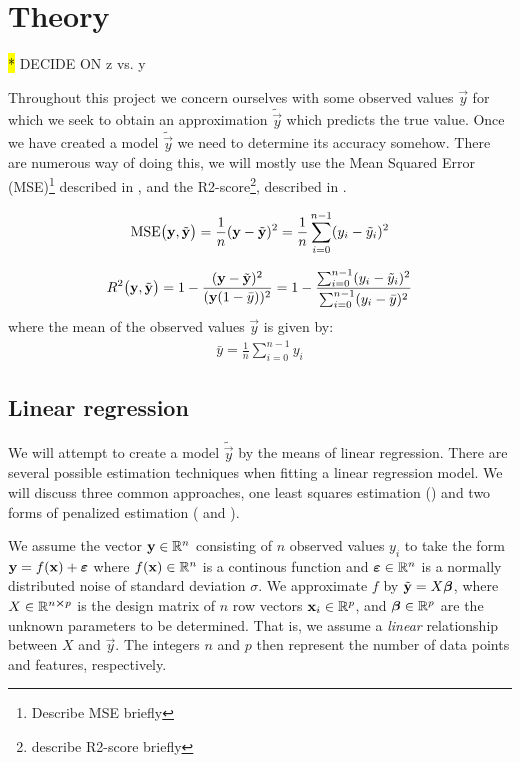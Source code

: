 \section{Theory}\label{sec:theroy}




\hl{*} DECIDE ON z vs. y

Throughout this project we concern ourselves with some observed values $\vec{y}$ for which we seek to obtain an approximation $\tilde{\vec{y}}$ which predicts the true value. Once we have created a model $\tilde{\vec{y}}$ we need to determine its accuracy somehow. There are numerous way of doing this, we will mostly use the Mean Squared Error (MSE)\footnote{Describe MSE briefly} described in , and the R2-score\footnote{describe R2-score briefly}, described in .


\begin{align}\label{eq:MSE}
    \MSE{\vec{y}, \tilde{\vec{y}}}= \frac{1}{n}(\vec{y}-\tilde{\vec{y}})^2= \frac{1}{n}\sum_{i=0}^{n-1} (y_i - \tilde{y}_i)^2
\end{align}

\begin{align}\label{eq:R2}
    \Rtwo {\vec{y}, \tilde{\vec{y}}} =1 - \frac{(\vec{y}-\tilde{\vec{y}})^2}{(\vec{y}(1-\bar{y}))^2}= 1 - \frac{\sum_{i=0}^{n-1}(y_i-\tilde{y}_i)^2}{\sum_{i=0}^{n-1}(y_i-\bar{y})^2}
\end{align}
where the mean of the observed values $\vec{y}$ is given by:
\begin{align*}
    \bar{y} = \frac{1}{n}\sum_{i=0}^{n-1} y_i
\end{align*}



\subsection{Linear regression}\label{sec:regression}
We will attempt to create a model $\tilde{\vec{y}}$ by the means of linear regression. 
There are several possible estimation techniques when fitting a linear regression model. We will discuss three common approaches, one least squares estimation () and two forms of penalized estimation ( and ).

We assume the vector $\vec{y} \in \RR[n]$ consisting of $n$ observed values $y_i$ to take the form $\vec{y}=f(\vec{x})+\svec{\epsilon}$ where $f(\vec{x})\in\RR[n]$ is a continous function and $\svec{\epsilon}\in \RR[n] $ is a normally distributed noise of standard deviation $\sigma$. We approximate $f$ by $\tilde{\vec{y}}=X\svec{\beta}$, where $X\in \RR[n\cross p]$ is the design matrix of $n$ row vectors $\vec{x}_i\in \RR[p]$, and $\svec{\beta}\in \RR[p]$ are the unknown parameters to be determined. That is, we assume a \textit{linear} relationship between $X$ and $\vec{y}$. The integers $n$ and $p$ then represent the number of data points and features, respectively. 

